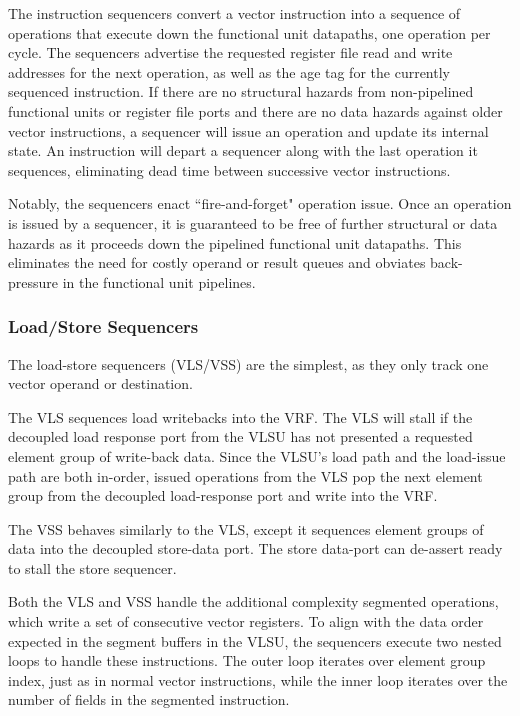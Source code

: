 The instruction sequencers convert a vector instruction into a sequence of operations that execute down the functional unit datapaths, one operation per cycle.
The sequencers advertise the requested register file read and write addresses for the next operation, as well as the age tag for the currently sequenced instruction.
If there are no structural hazards from non-pipelined functional units or register file ports and there are no data hazards against older vector instructions, a sequencer will issue an operation and update its internal state.
An instruction will depart a sequencer along with the last operation it sequences, eliminating dead time between successive vector instructions.

Notably, the sequencers enact ``fire-and-forget" operation issue.
Once an operation is issued by a sequencer, it is guaranteed to be free of further structural or data hazards as it proceeds down the pipelined functional unit datapaths.
This eliminates the need for costly operand or result queues and obviates back-pressure in the functional unit pipelines.


\subsubsection{Load/Store Sequencers}

The load-store sequencers (VLS/VSS) are the simplest, as they only track one vector operand or destination.

The VLS sequences load writebacks into the VRF.
The VLS will stall if the decoupled load response port from the VLSU has not presented a requested element group of write-back data.
Since the VLSU's load path and the load-issue path are both in-order, issued operations from the VLS pop the next element group from the decoupled load-response port and write into the VRF.

The VSS behaves similarly to the VLS, except it sequences element groups of data into the decoupled store-data port.
The store data-port can de-assert ready to stall the store sequencer.

Both the VLS and VSS handle the additional complexity segmented operations, which write a set of consecutive vector registers.
To align with the data order expected in the segment buffers in the VLSU, the sequencers execute two nested loops to handle these instructions. The outer loop iterates over element group index, just as in normal vector instructions, while the inner loop iterates over the number of fields in the segmented instruction.


